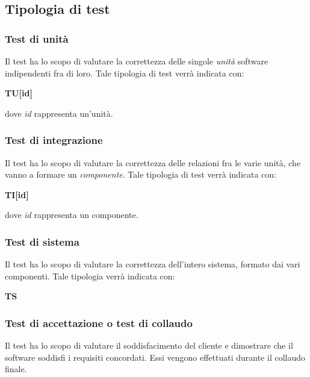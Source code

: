 \subsection{Tipologia di test}

\subsubsection{Test di unità}
Il test ha lo scopo di valutare la correttezza delle singole \textit{unità} software indipendenti fra di loro. Tale tipologia di test verrà indicata con:\\
\begin{center}
	\textbf{TU[id]}
\end{center}
dove \textit{id} rappresenta un'unità.

\subsubsection{Test di integrazione}
Il test ha lo scopo di valutare la correttezza delle relazioni fra le varie unità, che vanno a formare un \textit{componente}. Tale tipologia di test verrà indicata con:\\
\begin{center}
	\textbf{TI[id]}
\end{center}
dove \textit{id} rappresenta un componente.
\subsubsection{Test di sistema}
Il test ha lo scopo di valutare la correttezza dell'intero sistema, formato dai vari componenti. Tale tipologia verrà indicata con:\\
\begin{center}
	\textbf{TS}
\end{center}

\subsubsection{Test di accettazione o test di collaudo}
Il test ha lo scopo di valutare il soddisfacimento del cliente e dimostrare che il software soddisfi i requisiti concordati. Essi vengono effettuati durante il collaudo finale.